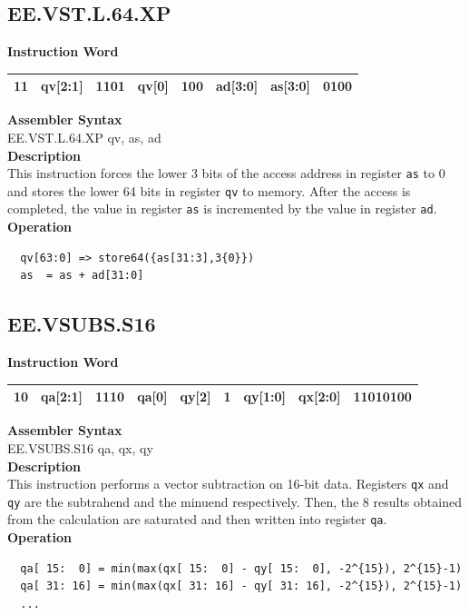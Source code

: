 \clearpage
\subsection{EE.VST.L.64.XP}\label{instruction:EEVSTL64XP}
\setlength\tabcolsep{6pt}
\textbf{Instruction Word} \\
\begin{tabular}{|c|c|c|c|c|c|c|c|}
	\hline
	11 & qv[2:1] & 1101 & qv[0] & 100 & ad[3:0] & as[3:0] & 0100 \\
	\hline
\end{tabular}

\textbf{Assembler Syntax} \\
EE.VST.L.64.XP qv, as, ad \\
\textbf{Description} \\
This instruction forces the lower 3 bits of the access address in register \lstinline{as} to 0 and stores the lower 64 bits in register \lstinline{qv} to memory. After the access is completed, the value in register \lstinline{as} is incremented by the value in register \lstinline{ad}.\\
\textbf{Operation}
\begin{lstlisting}
  qv[63:0] => store64({as[31:3],3{0}})
  as  = as + ad[31:0]
\end{lstlisting}

\clearpage
\subsection{EE.VSUBS.S16}\label{instruction:EEVSUBSS16}
\setlength\tabcolsep{6pt}
\textbf{Instruction Word} \\
\begin{tabular}{|c|c|c|c|c|c|c|c|c|}
	\hline
	10 & qa[2:1] & 1110 & qa[0] & qy[2] & 1 & qy[1:0] & qx[2:0] & 11010100 \\
	\hline
\end{tabular}

\textbf{Assembler Syntax} \\
EE.VSUBS.S16 qa, qx, qy \\
\textbf{Description} \\
This instruction performs a vector subtraction on 16-bit data. Registers \lstinline{qx} and \lstinline{qy} are the subtrahend and the minuend respectively. Then, the 8 results obtained from the calculation are saturated and then written into register \lstinline{qa}.\\
\textbf{Operation}
\begin{lstlisting}
  qa[ 15:  0] = min(max(qx[ 15:  0] - qy[ 15:  0], -2^{15}), 2^{15}-1)
  qa[ 31: 16] = min(max(qx[ 31: 16] - qy[ 31: 16], -2^{15}), 2^{15}-1)
  ...
\end{lstlisting}

